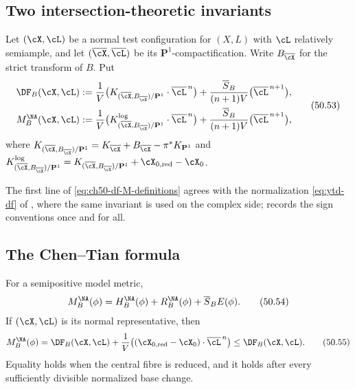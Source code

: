 \subsection{Two intersection-theoretic invariants}
\label{sec:ch50-df-def}

\begin{definition}
\label{def:ch50-df}
Let $(\cX,\cL)$ be a normal test configuration for $(X,L)$ with
$\cL$ relatively semiample, and let
$(\overline\cX,\overline\cL)$ be its $\mathbf P^1$-compactification.
Write $B_{\overline\cX}$ for the strict transform of $B$.  Put
\[
 \begin{split}
 \DF_B(\cX,\cL)
 &:=\frac1V\bigl(K_{(\overline\cX,B_{\overline\cX})/\mathbf P^1}
       \cdot\overline\cL^{\,n}\bigr)
   +\frac{\overline S_B}{(n+1)V}\bigl(\overline\cL^{\,n+1}\bigr),\\
 M^{\NA}_B(\cX,\cL)
 &:=\frac1V\bigl(K^{\log}_{(\overline\cX,B_{\overline\cX})/\mathbf P^1}
       \cdot\overline\cL^{\,n}\bigr)
   +\frac{\overline S_B}{(n+1)V}\bigl(\overline\cL^{\,n+1}\bigr),
 \end{split}
\tag{50.53}\label{eq:ch50-df-M-definitions}
\]
where
$K_{(\overline\cX,B_{\overline\cX})/\mathbf P^1}
=K_{\overline\cX}+B_{\overline\cX}-\pi^*K_{\mathbf P^1}$ and
$K^{\log}_{(\overline\cX,B_{\overline\cX})/\mathbf P^1}
=K_{(\overline\cX,B_{\overline\cX})/\mathbf P^1}
+\cX_{0,\mathrm{red}}-\cX_0$.
\end{definition}

The first line of \eqref{eq:ch50-df-M-definitions} agrees with the
normalization \eqref{eq:ytd-df} of , where the same
invariant is used on the complex side;  records
the sign conventions once and for all.

\subsection{The Chen--Tian formula}
\label{sec:ch50-chen-tian}

\par\noindent\begin{minipage}{\textwidth}
\begin{theorem}\label{thm:stability-chen-tian}
For a semipositive model metric,
\[
             M_B^{\NA}(\phi)
              =H_B^{\NA}(\phi)+R_B^{\NA}(\phi)
                              +\overline S_BE(\phi).
\tag{50.54}\label{eq:stability-chen-tian}
\]
If $(\cX,\cL)$ is its normal representative, then
\[
 M_B^{\NA}(\phi)
  =\DF_B(\cX,\cL)
   +\frac1V\bigl((\cX_{0,\mathrm{red}}-\cX_0)
                        \cdot\overline\cL^{\,n}\bigr)
  \leq\DF_B(\cX,\cL).
\tag{50.55}\label{eq:stability-M-DF-correction}
\]
Equality holds when the central fibre is reduced, and it holds after every
sufficiently divisible normalized base change.
\end{theorem}
\end{minipage}\par\medskip

